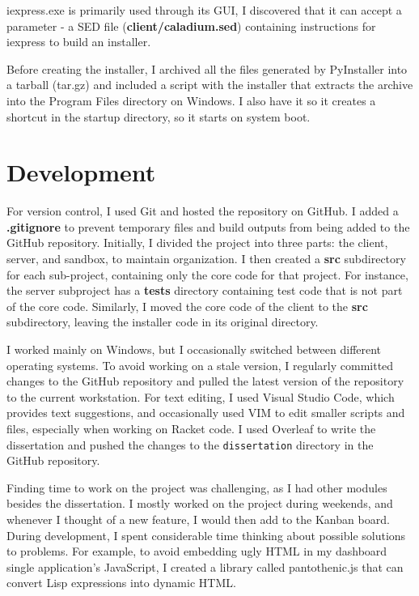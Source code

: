 iexpress.exe is primarily used through its GUI,
I discovered that it can accept a parameter
- a SED file (\textbf{client/caladium.sed})
containing instructions for iexpress to build an installer.

Before creating the installer,
I archived all the files generated by PyInstaller into a tarball (tar.gz)
and included a script with the installer that
extracts the archive into the Program Files directory on Windows.
I also have it so it creates a shortcut in the startup directory,
so it starts on system boot.

\section{Development}
For version control, I used Git and hosted the repository on GitHub.
I added a \textbf{.gitignore} to prevent temporary files
and build outputs from being added to the GitHub repository.
Initially, I divided the project into
three parts: the client, server, and sandbox,
to maintain organization. I then created a \textbf{src} subdirectory
for each sub-project, containing only the core code for that project.
For instance, the server subproject has a \textbf{tests} directory
containing test code that is not part of the core code.
Similarly, I moved the core code of the client to the
\textbf{src} subdirectory, leaving
the installer code in its original directory.

I worked mainly on Windows, but I occasionally switched
between different operating systems. To avoid working on
a stale version, I regularly committed changes to the
GitHub repository and pulled the latest version of the
repository to the current workstation. For text editing,
I used Visual Studio Code, which provides text suggestions,
and occasionally used VIM to edit smaller scripts and files,
especially when working on Racket code.
I used Overleaf to write the dissertation and pushed the changes to the
\texttt{dissertation} directory in the GitHub repository.

Finding time to work on the project was challenging,
as I had other modules besides the dissertation.
I mostly worked on the project during weekends, and whenever
I thought of a new feature, I would then add to the Kanban board.
During development, I spent considerable time thinking
about possible solutions to problems. For example,
to avoid embedding ugly HTML in my dashboard single application's JavaScript,
I created a library called pantothenic.js that can convert 
Lisp expressions into dynamic HTML.


